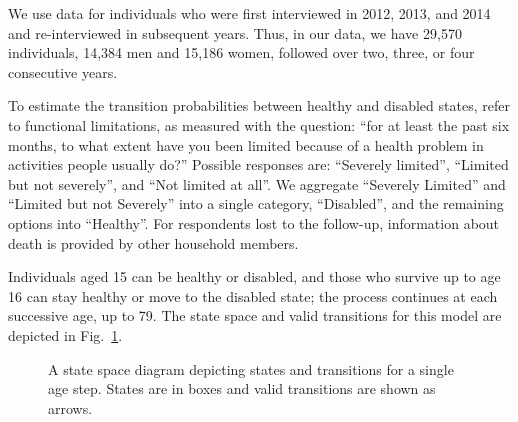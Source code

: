 \documentclass[a4paper,left=1.25cm,right=1.25cm,top=1.25cm,bottom=1.25cm]{article}
\begin{document}
We use data for individuals who were first interviewed in 2012, 2013, and 2014 and re-interviewed in subsequent years. Thus, in our data, we have 29,570 individuals, 14,384 men and 15,186 women, followed over two, three, or four consecutive years.  

To estimate the transition probabilities between healthy and disabled states, refer to functional limitations, as measured with the question: ``for at least the past six months, to what extent have you been limited because of a health problem in activities people usually do?'' Possible responses are: ``Severely limited'', ``Limited but not severely'', and ``Not limited at all''. We aggregate ``Severely Limited'' and ``Limited but not Severely'' into a single category, ``Disabled'', and the remaining options into ``Healthy''. For respondents lost to the follow-up, information about death is provided by other household members.

Individuals aged 15 can be healthy or disabled, and those who survive up to age 16 can stay healthy or move to the disabled state; the process continues at each successive age, up to 79. The state space and valid transitions for this model are depicted in Fig.~\ref{fig:statespace}.

\begin{figure}[t!]\centering
{}
\caption{A state space diagram depicting states and transitions for a single age step. States are in boxes and valid transitions are shown as arrows.}
\label{fig:statespace}
\end{figure}
\end{document}
